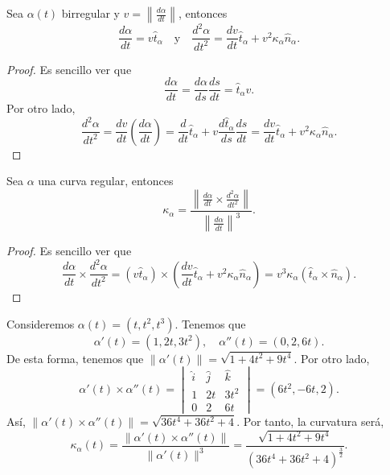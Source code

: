 \begin{prop}
Sea $\displaystyle \alpha\left(t\right) $ birregular y $\displaystyle v = \left\|\frac{d \alpha}{d t}\right\| $, entonces
\[\frac{d\alpha }{dt}=v\hat{t}_{\alpha } \quad \text{y} \quad \frac{d^{2}\alpha }{dt ^{2}}=\frac{dv}{dt}\hat{t}_{\alpha }+v^{2}\kappa_{\alpha }\hat{n}_{\alpha } .\]
\end{prop}
\begin{proof}
Es sencillo ver que 
\[\frac{d\alpha }{d t}=\frac{d\alpha }{d s} \frac{d s}{dt }= \hat{t}_{\alpha }v .\]
Por otro lado, 
\[\frac{d^{2}\alpha }{d t^{2}} = \frac{dv}{dt}\left(\frac{d\alpha }{dt}\right) = \frac{d}{dt}\hat{t}_{\alpha } + v\frac{d\hat{t}_{\alpha }}{d s}\frac{d s }{d t}=\frac{dv}{dt}\hat{t}_{\alpha }+v^{2}\kappa_{\alpha }\hat{n}_{\alpha } .\]
\end{proof}
\begin{colorary} Sea $\displaystyle \alpha  $ una curva regular, entonces 
\[\kappa_{\alpha }=\frac{\left\|\frac{d\alpha }{dt} \times \frac{d^{2}\alpha }{dt ^{2}}\right\|}{\left\|\frac{d\alpha }{dt}\right\|^{3}} .\]
\end{colorary}
\begin{proof}
Es sencillo ver que 
\[\frac{d\alpha }{dt} \times \frac{d^{2}\alpha }{dt ^{2}}=\left(v\hat{t}_{\alpha }\right)\times\left(\frac{dv}{dt}\hat{t}_{\alpha } + v^{2}\kappa_{\alpha }\hat{n}_{\alpha }\right)=v^{3}\kappa_{\alpha }\left(\hat{t}_{\alpha}\times\hat{n}_{\alpha}\right) .\]
\end{proof}
\begin{eg}
Consideremos $\displaystyle \alpha\left(t\right)=\left(t, t ^{2}, t ^{3}\right) $. Tenemos que 
\[\alpha'\left(t\right)=\left(1, 2t, 3t ^{2}\right), \quad  \alpha''\left(t\right)=\left(0,2,6t\right).\]
De esta forma, tenemos que $\displaystyle \left\|\alpha'\left(t\right)\right\|=\sqrt{1 + 4t ^{2} + 9 t ^{4}} $. Por otro lado, 
\[\alpha'\left(t\right)\times \alpha''\left(t\right)=\begin{vmatrix} \hat{i} & \hat{j} & \hat{k} \\ 1 & 2t & 3t ^{2} \\ 0 & 2 & 6t \end{vmatrix} = \left(6t ^{2}, -6t, 2\right) .\]
Así, $\displaystyle \|\alpha'\left(t\right) \times \alpha''\left(t\right)\| = \sqrt{36 t ^{4} + 36 t ^{2} + 4} $. Por tanto, la curvatura será,
\[\kappa_{\alpha }\left(t\right)=\frac{\|\alpha'\left(t\right) \times \alpha''\left(t\right)\|}{\|\alpha'\left(t\right)\|^{3}} = \frac{\sqrt{1 + 4 t ^{2} + 9t ^{4}}}{\left(36t ^{4}+36 t ^{2} + 4\right)^{\frac{3}{2}}} .\]
\end{eg}
